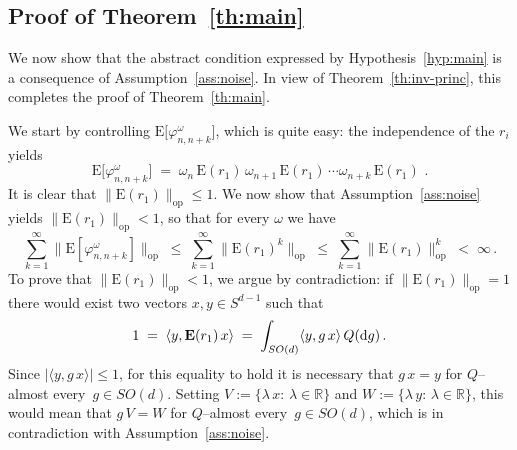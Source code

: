 \documentclass[a4paper,reqno,11pt]{amsart}
\numberwithin{equation}{section}
\newcommand{\gl}{\lambda}
\newcommand{\go}{\omega}
\newcommand{\dd}{\text{\rm d}}             %
\newcommand{\R}{\mathbb{R}}
\def\bE{\ensuremath{\bs{\mathrm{E}}}}
\def\bs{\boldsymbol}
\renewcommand{\phi}{\varphi}
\begin{document}

\smallskip

\subsection{Proof of Theorem~\ref{th:main}}

\label{sec:validity}

We now show that the abstract condition expressed by Hypothesis~\ref{hyp:main}
is a consequence of Assumption~\ref{ass:noise}. In view of Theorem~\ref{th:inv-princ},
this completes the proof of Theorem~\ref{th:main}.

\smallskip

We start by controlling $\bE \big[ \phi^\go_{n,n+k} \big]$, which is quite easy:
the independence of the $r_i$ yields
\begin{equation} \label{eq:val1}
	\bE \big[ \phi^\go_{n,n+k} \big] \;=\;
	\go_n \, \bE(r_1) \, \go_{n+1} \, \bE(r_1) \, \cdots
	\go_{n+k} \, \bE(r_1)\,\,.
\end{equation}
It is clear that $\| \bE(r_1) \|_{\text{op}} \le 1$.
We now show that Assumption~\ref{ass:noise} yields $\| \bE(r_1) \|_{\text{op}} < 1$,
so that for every $\go$ we have
\begin{equation} \label{eq:analogy}
	\sum_{k=1}^\infty \big\| \bE [\phi^\go_{n,n+k}] \big\|_{\text{op}}
	\;\le\; \sum_{k=1}^\infty \big\| \bE(r_1)^k \big\|_{\text{op}}
	\;\le\; \sum_{k=1}^\infty \| \bE(r_1)\|_{\text{op}}^k \;<\; \infty \,.
\end{equation}
To prove that $\| \bE(r_1) \|_{\text{op}} < 1$, we argue by contradiction:
if $\| \bE(r_1) \|_{\text{op}} = 1$ there would exist two vectors
$x,y \in S^{d-1}$ such that
\begin{equation}
	1 \;=\; \langle y, \bE(r_1) \, x \rangle \;=\; \int_{SO(d)} \langle y, g \, x \rangle
	\, Q(\dd g) \,.
\end{equation}
Since $|\langle y, g \, x \rangle | \le 1$, for this equality to hold it is
necessary that $g \, x = y$ for $Q$--almost every~$g \in SO(d)$. 
Setting $V := \{\gl\, x:\, \gl \in \R\}$ and $W := \{\gl\, y: \, \gl \in \R\}$,
this would mean that $g \, V = W$ for $Q$--almost every~$g \in SO(d)$, which is
in contradiction with Assumption~\ref{ass:noise}.

\smallskip
\end{document}

